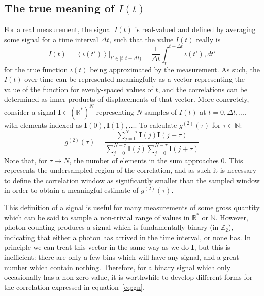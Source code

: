 \documentclass{article}
\newcommand{\angles}[1]{\ensuremath{\left\langle #1 \right\rangle}}
\newcommand{\gn}[1]{\ensuremath{g^{(#1)}}}
\newcommand{\integers}{\ensuremath{\mathbb{Z}}}
\newcommand{\wholes}{\ensuremath{\mathbb{N}}}
\newcommand{\reals}{\ensuremath{\mathbb{R}}}
\renewcommand{\vec}{\mathbf}
\begin{document}
\subsection{The true meaning of $I(t)$}
\label{sec:sampling_intensity}
For a real measurement, the signal $I(t)$ is real-valued and defined by averaging some signal for a time interval $\Delta t$, such that the value $I(t)$ really is
\begin{equation}
I(t) = \left.\angles{\iota(t')}\right|_{t'\in[t,t+\Delta t)} = \frac{1}{\Delta t}\int_{t}^{t+\Delta t}{\iota(t'),dt'}
\end{equation}
for the true function $\iota(t)$ being approximated by the measurement. As such, the $I(t)$ over time can be represented meaningfully as a vector representing the value of the function for evenly-spaced values of $t$, and the correlations can be determined as inner products of displacements of that vector. More concretely, consider a signal $\vec{I}\in\left(\reals^{*}\right)^{N}$ representing $N$ samples of $I(t)$ at $t=0, \Delta t, \ldots$, with elements indexed as $\vec{I}(0), \vec{I}(1),\ldots$. To calculate $\gn{2}(\tau)$ for $\tau\in\wholes$:
\begin{equation}
\gn{2}(\tau) = \frac{\sum_{j=0}^{N-\tau}{\vec{I}(j)\vec{I}(j+\tau)}}
                    {\sum_{j=0}^{N-\tau}{\vec{I}(j)}\sum_{j=0}^{N-\tau}{\vec{I}(j+\tau)}}
\end{equation}
Note that, for $\tau\rightarrow N$, the number of elements in the sum approaches 0. This represents the undersampled region of the correlation, and as such it is necessary to define the correlation window as significantly smaller than the sampled window in order to obtain a meaningful estimate of $\gn{2}(\tau)$.

This definition of a signal is useful for many measurements of some gross quantity which can be said to sample a non-trivial range of values in $\reals^{*}$ or \wholes. However, photon-counting produces a signal which is fundamentally binary (in $\integers_{2}$), indicating that either a photon has arrived in the time interval, or none has. In principle we can treat this vector in the same way as we do $\vec{I}$, but this is inefficient: there are only a few bins which will have any signal, and a great number which contain nothing. Therefore, for a binary signal which only occasionally has a non-zero value, it is worthwhile to develop different forms for the correlation expressed in equation~\ref{eq:gn}.
\end{document}
